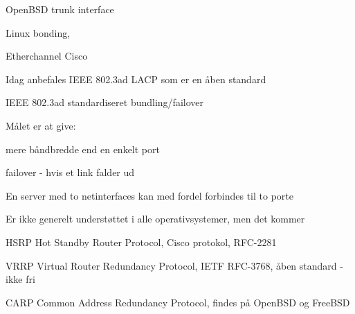 \begin{list1}
\item OpenBSD trunk interface
\item Linux bonding, 
\item Etherchannel Cisco
\item Idag anbefales IEEE 802.3ad LACP som er en åben standard
\item {}
\end{list1}



\begin{list1}
\item IEEE 802.3ad standardiseret bundling/failover
\item Målet er at give:
\begin{list2}
\item mere båndbredde end en enkelt port
\item failover - hvis et link falder ud
\end{list2}
\item En server med to netinterfaces kan med fordel forbindes til to porte
\item Er ikke generelt understøttet i alle operativsystemer, men det kommer
\item {}
\end{list1}




\begin{list1}
\item HSRP Hot Standby Router Protocol, Cisco protokol, RFC-2281
\item VRRP Virtual Router Redundancy Protocol, IETF RFC-3768, åben standard - ikke fri
\item CARP Common Address Redundancy Protocol, findes på OpenBSD og FreeBSD
\item {}
\end{list1}









